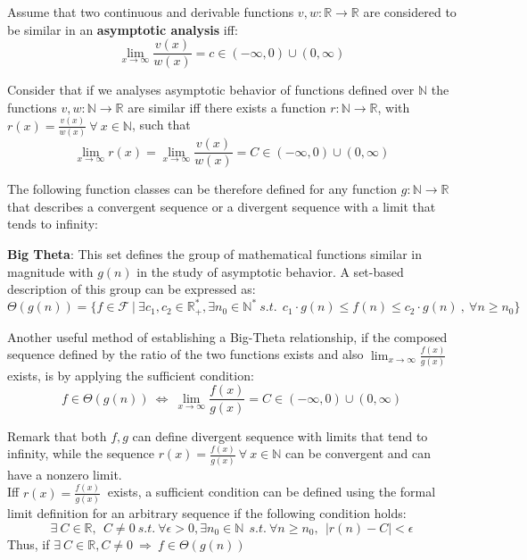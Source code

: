 \begin{definition}
Assume that two continuous and derivable functions $v,w:\mathbb{R}\longrightarrow\mathbb{R}$ are considered to be similar in an \textbf{asymptotic analysis} iff: 
  \[\lim_{x\to\infty} \frac{v(x)}{w(x)} = c \in (-\infty, 0) \cup (0,\infty) \]
\end{definition}

\begin{lemma}
  Consider that if we analyses asymptotic behavior of functions defined over $\mathbb{N}$ the functions $v,w:\mathbb{N}\longrightarrow\mathbb{R}$ are similar iff there exists a function $r:\mathbb{N}\longrightarrow\mathbb{R}$, with $r(x) = \frac{v(x)}{w(x)}\ \forall\ x\in\mathbb{N}$, such that
  \[\lim_{x\to\infty} r(x) = \lim_{x\to\infty} \frac{v(x)}{w(x)} = C \in (-\infty, 0) \cup (0,\infty) \]
\end{lemma}

The following function classes can be therefore defined for any function $g:\mathbb{N}\longrightarrow\mathbb{R}$ that describes a convergent sequence or a divergent sequence with a limit that tends to infinity:
\begin{definition}   
  \textbf{Big Theta}: This set defines the group of mathematical functions similar in magnitude with  $g(n)$ in the study of asymptotic behavior. A set-based description of this group can be expressed as:
  \[\Theta(g(n))= \lbrace f \in \mathcal{F}\ |\ \exists c_{1}, c_{2} \in \mathbb{R}^{*}_{+}, \exists n_{0} \in \mathbb{N}^{*}\ s.t.\ \ c_{1} \cdot g(n) \leq f(n) \leq c_{2} \cdot g(n)\ ,\  \forall n \geq n_{0} \rbrace\]
\end{definition}  

\begin{lemma}
  Another useful method of establishing a Big-Theta relationship, if the composed sequence defined by the ratio of the two functions exists and also $ \lim_{x\to\infty} \frac{f(x)}{g(x)}$ exists, is by applying the sufficient condition:
    \[ f \in \Theta(g(n))\ \Leftrightarrow\ \lim_{x\to\infty} \frac{f(x)}{g(x)} = C \in (-\infty, 0) \cup (0,\infty) \]
\end{lemma}

Remark that  both $f,g$ can define divergent sequence with limits that tend to infinity, while the sequence $r(x) = \frac{f(x)}{g(x)}\ \forall\ x\in\mathbb{N}$ can be convergent and can have a nonzero limit. \\
Iff $ r(x) = \frac{f(x)}{g(x)}\ $ exists, a sufficient condition can be defined using the formal limit definition for an arbitrary sequence if the following condition holds:
  \[\exists \  C \in \mathbb{R}, \ \ C \neq 0 \ s.t. \ \forall \epsilon > 0,\exists n_{0} \in \mathbb{N}\ \ s.t.\ \forall n\geq n_{0}, \ \  |r(n) - C| < \epsilon  \]
  Thus, if $ \exists \  C \in \mathbb{R}, C \neq 0 \  \Rightarrow\  f \in \Theta(g(n))\ $


